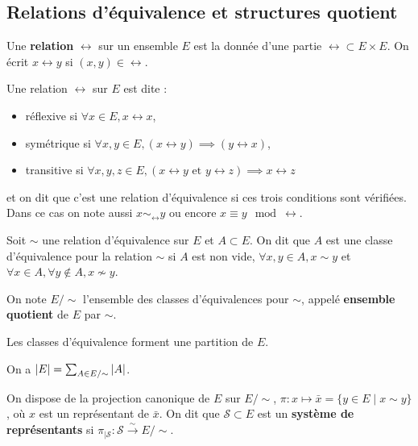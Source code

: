 \subsection{Relations d'équivalence et structures quotient}

	\begin{defn}
		Une \textbf{relation} $\rel$ sur un ensemble $E$ est la donnée d'une partie $\rel \subset E \times E$.
		On écrit $x \rel y$ si $(x,y) \in \rel$.
	\end{defn}

	\begin{defn}
		Une relation $\rel$ sur $E$ est dite :
		\begin{itemize}
			\item[\textbullet] réflexive si $\forall x \in E, x \rel x$,
			\item[\textbullet] symétrique si $\forall x, y \in E, \left( x \rel y \right) \implies \left( y \rel x \right)$,
			\item[\textbullet] transitive si $\forall x, y, z \in E, \left( x \rel y \text{ et } y \rel z \right) \implies x \rel z$
		\end{itemize}
		et on dit que c'est une relation d'équivalence si ces trois conditions sont vérifiées.
		Dans ce cas on note aussi $x \sim_\rel y$ ou encore $x \equiv y \mod \rel$.
	\end{defn}

	\begin{defn}
	Soit $\sim$ une relation d'équivalence sur $E$ et $A \subset E$.
	On dit que $A$ est une classe d'équivalence pour la relation $\sim$ si $A$ est non vide, $\forall x,y \in A, x \sim y$ et $\forall x \in A, \forall y \not\in A, x \not\sim y$.
	\end{defn}

	\begin{note}
		On note $E / \sim$ l'ensemble des classes d'équivalences pour $\sim$, appelé \textbf{ensemble quotient} de $E$ par $\sim$.
	\end{note}

	\begin{pop}
		Les classes d'équivalence forment une partition de $E$.
	\end{pop}

	\begin{cor}
		On a $\left\lvert E\right\rvert = \sum_{A \in E/\sim} \left\lvert A\right\rvert$.
	\end{cor}

	On dispose de la projection canonique de $E$ sur $E/\sim$, $\pi \colon x \mapsto \bar{x} = \{ y \in E \mid x \sim y \}$, où $x$ est un représentant de $\bar{x}$.
	On dit que $\mathcal{S} \subset E$ est un \textbf{système de représentants} si $\pi_{|\mathcal{S}} \colon \mathcal{S} \overset{\sim}{\to} E/\sim$.

